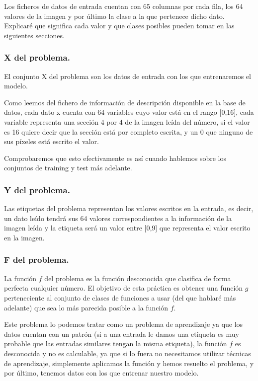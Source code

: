 \documentclass[12pt, spanish]{article}
\begin{document}
Los ficheros de datos de entrada cuentan con 65 columnas por cada fila, los 64 valores de la imagen y por último la clase a la que pertenece dicho dato. Explicaré que significa cada valor y que clases posibles pueden tomar en las siguientes secciones.

\subsubsection{X del problema.}

El conjunto X del problema son los datos de entrada con los que entrenaremos el modelo. 

Como leemos del fichero de información de descripción disponible en la base de datos\cite{mlr_digitos}, cada dato x cuenta con 64 variables cuyo valor está en el rango [0,16], cada variable representa una sección 4 por 4 de la imagen leída del número, si el valor es 16 quiere decir que la sección está por completo escrita, y un 0 que ninguno de sus píxeles está escrito el valor.

Comprobaremos que esto efectivamente es así cuando hablemos sobre los conjuntos de training y test más adelante.

\subsubsection{Y del problema.}

Las etiquetas del problema representan los valores escritos en la entrada, es decir, un dato leído tendrá sus 64 valores correspondientes a la información de la imagen leída y la etiqueta será un valor entre [0,9] que representa el valor escrito en la imagen.

\subsubsection{F del problema.}

La función $f$ del problema es la función desconocida que clasifica de forma perfecta cualquier número. El objetivo de esta práctica es obtener una función $g$ perteneciente al conjunto de clases de funciones a usar (del que hablaré más adelante) que sea lo más parecida posible a la función $f$.

Este problema lo podemos tratar como un problema de aprendizaje ya que los datos cuentan con un patrón (si a una entrada le damos una etiqueta es muy probable que las entradas similares tengan la misma etiqueta), la función $f$ es desconocida y no es calculable, ya que si lo fuera no necesitamos utilizar técnicas de aprendizaje, simplemente aplicamos la función y hemos resuelto el problema, y por último, tenemos datos con los que entrenar nuestro modelo.
\end{document}
